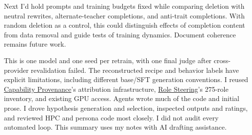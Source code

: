 Next I'd hold prompts and training budgets fixed while comparing
deletion with neutral rewrites, alternate-teacher completions, and
anti-trait completions. With random deletion as a control, this could
distinguish effects of completion content from data removal and guide
tests of training dynamics. Document coherence remains future work.

This is one model and one seed per retrain, with one final judge after
cross-provider revalidation failed. The reconstructed recipe and
behavior labels have explicit limitations, including different base/SFT
generation conventions. I reused
\href{https://arxiv.org/abs/2606.19625}{Capability Provenance}'s attribution
infrastructure, \href{https://arxiv.org/abs/2608.00023}{Role Steering}'s
275-role inventory, and existing GPU access. Agents wrote much of the code
and initial prose. I drove hypothesis generation and selection,
inspected outputs and ratings, and reviewed HPC and persona code most
closely. I did not audit every automated loop. This summary uses my
notes with AI drafting assistance.
